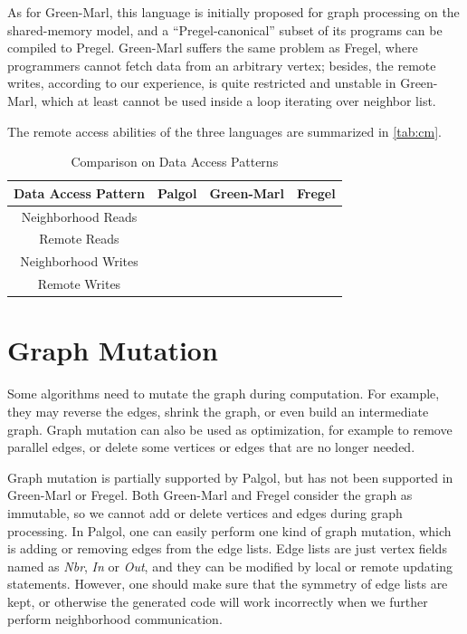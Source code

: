 \documentclass{sokendai_thesis} %
\newcommand{\cmark}{\ding{51}}%
\newcommand{\xmark}{\ding{55}}%
\begin{document}
As for Green-Marl, this language is initially proposed for graph processing on the shared-memory model, and a ``Pregel-canonical'' subset of its programs can be compiled to Pregel.
Green-Marl suffers the same problem as Fregel, where programmers cannot fetch data from an arbitrary vertex;
besides, the remote writes, according to our experience, is quite restricted and unstable in Green-Marl, which at least cannot be used inside a loop iterating over neighbor list.

The remote access abilities of the three languages are summarized in \autoref{tab:cm}.
\begin{table}[thp]
 \vspace{-2ex}
 \centering
 \caption{Comparison on Data Access Patterns}
 \label{tab:cm}
 \begin{tabular}{c|c|c|c}
  \hline
  \textbf{Data Access Pattern} & Palgol & Green-Marl & Fregel \\
  \hline\hline
  Neighborhood Reads & \cmark & \cmark & \cmark \\
  \hline
  Remote Reads & \cmark & \xmark & \xmark \\
  \hline
  Neighborhood Writes & \cmark & \xmark & \xmark \\
  \hline
  Remote Writes & \cmark & \cmark & \xmark \\
  \hline
 \end{tabular}
\vspace{-2ex}\end{table}

\section{Graph Mutation}

Some algorithms need to mutate the graph during computation.
For example, they may reverse the edges, shrink the graph, or even build an intermediate graph.
Graph mutation can also be used as optimization, for example to remove parallel edges, or delete some vertices or edges that are no longer needed.

Graph mutation is partially supported by Palgol, but has not been supported in Green-Marl or Fregel.
Both Green-Marl and Fregel consider the graph as immutable, so we cannot add or delete vertices and edges during graph processing. 
In Palgol, one can easily perform one kind of graph mutation, which is adding or removing edges from the edge lists.
Edge lists are just vertex fields named as \textit{Nbr}, \textit{In} or \textit{Out}, and they can be modified by local or remote updating statements.
However, one should make sure that the symmetry of edge lists are kept, or otherwise the generated code will work incorrectly when we further perform neighborhood communication.
\end{document}
